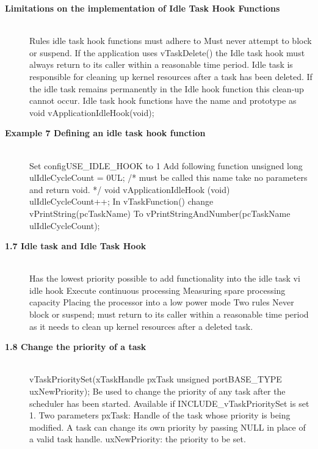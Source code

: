 \begin{description}
\os{\newpage}



\item[{\rot\bf Limitations on the implementation of Idle Task Hook Functions}]~\\[-3ex]
\bi
\ite Rules idle task hook functions must adhere to
\bi
\ite Must never attempt to block or suspend.
\ite If the application uses vTaskDelete() the Idle task hook must always return to its caller within a reasonable time period.
\bi
\ite Idle task is responsible for cleaning up kernel resources after a task has been deleted.
\ite If the idle task remains permanently in the Idle hook function this clean-up cannot occur.
\ei
\ite Idle task hook functions have the name and prototype as
\bi
\ite void vApplicationIdleHook(void);
\ei
\ei
\ei

\os{\newpage}



\item[{\rot\bf Example 7 Defining an idle task hook function}]~\\[-3ex]
\bi
\ite Set configUSE_IDLE_HOOK to 1
\ite Add following function
\ite unsigned long ulIdleCycleCount = 0UL;
\ite /* must be called this name take no parameters and return void. */
\ite void vApplicationIdleHook (void) {
\ite    ulIdleCycleCount++;
\ite }
\ite In vTaskFunction() change
\ite 	vPrintString(pcTaskName) To
\ite      vPrintStringAndNumber(pcTaskName ulIdleCycleCount);
\ei

\os{\newpage}



\item[{\rot\bf 1.7 Idle task and Idle Task Hook}]~\\[-3ex]
\bi
\ite Has the lowest priority possible to add functionality into the idle task vi idle hook
\bi
\ite Execute continuous processing
\ite Measuring spare processing capacity
\ite Placing the processor into a low power mode
\ei
\ite Two rules
\bi
\ite Never block or suspend; must return to its caller within a reasonable time period as it needs to clean up kernel resources after a deleted task.
\ei
\ei

\os{\newpage}



\item[{\rot\bf 1.8 Change the priority of a task}]~\\[-3ex]
\bi
\ite vTaskPrioritySet(xTaskHandle pxTask unsigned portBASE_TYPE uxNewPriority);
\ite Be used to change the priority of any task after the scheduler has been started.
\ite Available if INCLUDE_vTaskPrioritySet  is set 1.
\ei
\ite Two parameters
\bi
\ite pxTask: Handle of the task whose priority is being modified. A task can change its own priority by passing NULL in place of a valid task handle.
\ite uxNewPriority:  the priority to be set.
\ei
\ei


\end{description}

